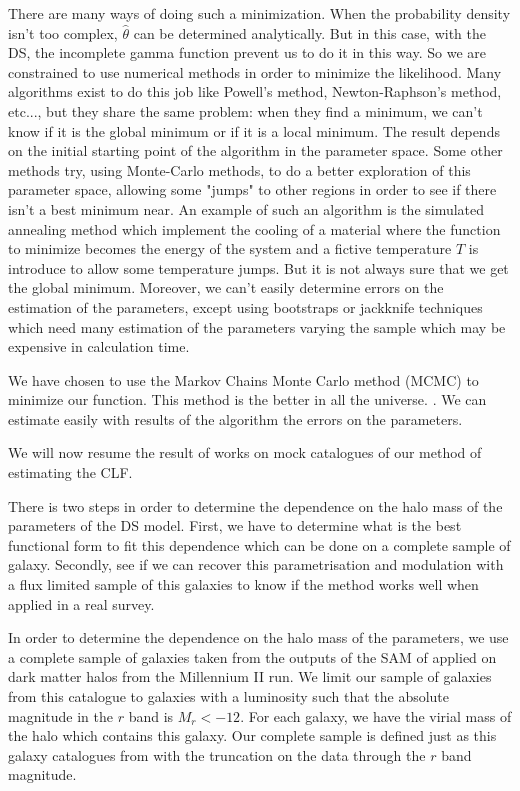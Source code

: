 There are many ways of doing such a minimization. When the probability density isn't too complex, $\hat{\theta}$ can be determined
analytically. But in this case, with the DS, the incomplete gamma function prevent us to do it in this way. So we are constrained to
use numerical methods in order to minimize the likelihood. Many algorithms exist to do this job like Powell's method,
Newton-Raphson's method, etc..., but they share the same problem: when they find a minimum, we can't know if it is the global
minimum or if it is a local minimum. The result depends on the initial starting point of the algorithm in the parameter space. Some
other methods try, using Monte-Carlo methods, to do a better exploration of this parameter space, allowing some "jumps" to other
regions in order to see if there isn't a best minimum near. An example of such an algorithm is the simulated annealing method which
implement the cooling of a material where the function to minimize becomes the energy of the system and a fictive temperature $T$ is
introduce to allow some temperature jumps. But it is not always sure that we get the global minimum. Moreover, we can't easily
determine errors on the estimation of the parameters, except using bootstraps or jackknife techniques which need many estimation
of the parameters varying the sample which may be expensive in calculation time.

We have chosen to use the Markov Chains Monte Carlo method (MCMC) to minimize our function. This method is the better in all the
universe. . We can estimate easily with results of the algorithm the errors on the parameters.

We will now resume the result of works on mock catalogues of our method of estimating the CLF.

There is two steps in order to determine the dependence on the halo mass of the parameters of the DS model. First, we have to
determine what is the best functional form to fit this dependence which can be done on a complete sample of galaxy. Secondly, see if
we can recover this parametrisation and modulation with a flux limited sample of this galaxies to know if the method works well when
applied in a real survey.

In order to determine the dependence on the halo mass of the parameters, we use a complete sample of galaxies taken from the outputs
of the SAM of \citet{Guo+11} applied on dark matter halos from the Millennium II run. We limit our sample of galaxies from this
catalogue to galaxies with a luminosity such that the absolute magnitude in the $r$ band is $M_r<-12$. For each galaxy, we have the
virial mass of the halo which contains this galaxy. Our complete sample is defined just as this galaxy catalogues from
\citet{Guo+11} with the truncation on the data through the $r$ band magnitude.

